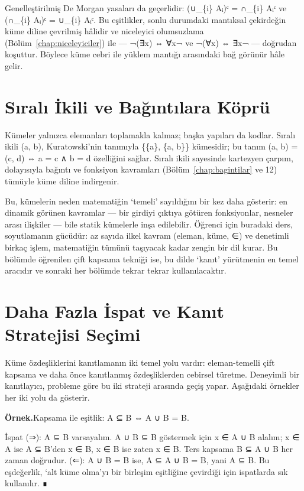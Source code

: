 Genelleştirilmiş De Morgan yasaları da geçerlidir: (∪\_\{i\} Aᵢ)ᶜ = ∩\_\{i\} Aᵢᶜ ve (∩\_\{i\} Aᵢ)ᶜ = ∪\_\{i\} Aᵢᶜ. Bu eşitlikler, sonlu durumdaki mantıksal çekirdeğin küme diline çevrilmiş hâlidir ve niceleyici olumsuzlama (Bölüm~\ref{chap:niceleyiciler}) ile — ¬(∃x) ⇔ ∀x¬ ve ¬(∀x) ⇔ ∃x¬ — doğrudan koşuttur. Böylece küme cebri ile yüklem mantığı arasındaki bağ görünür hâle gelir.

\section{Sıralı İkili ve Bağıntılara Köprü}

Kümeler yalnızca elemanları toplamakla kalmaz; başka yapıları da kodlar. Sıralı ikili (a, b), Kuratowski’nin tanımıyla \{\{a\}, \{a, b\}\} kümesidir; bu tanım (a, b) = (c, d) ⇔ a = c ∧ b = d özelliğini sağlar. Sıralı ikili sayesinde kartezyen çarpım, dolayısıyla bağıntı ve fonksiyon kavramları (Bölüm~\ref{chap:bagintilar} ve 12) tümüyle küme diline indirgenir.

Bu, kümelerin neden matematiğin ‘temeli’ sayıldığını bir kez daha gösterir: en dinamik görünen kavramlar — bir girdiyi çıktıya götüren fonksiyonlar, nesneler arası ilişkiler — bile statik kümelerle inşa edilebilir. Öğrenci için buradaki ders, soyutlamanın gücüdür: az sayıda ilkel kavram (eleman, küme, ∈) ve denetimli birkaç işlem, matematiğin tümünü taşıyacak kadar zengin bir dil kurar. Bu bölümde öğrenilen çift kapsama tekniği ise, bu dilde ‘kanıt’ yürütmenin en temel aracıdır ve sonraki her bölümde tekrar tekrar kullanılacaktır.

\section{Daha Fazla İspat ve Kanıt Stratejisi Seçimi}

Küme özdeşliklerini kanıtlamanın iki temel yolu vardır: eleman-temelli çift kapsama ve daha önce kanıtlanmış özdeşliklerden cebirsel türetme. Deneyimli bir kanıtlayıcı, probleme göre bu iki strateji arasında geçiş yapar. Aşağıdaki örnekler her iki yolu da gösterir.

\begin{tcolorbox}[bookbox,colback=cEx]\textbf{\textsf{\textcolor{cAcc}{Örnek.}}}\quad Kapsama ile eşitlik: A ⊆ B ⇔ A ∪ B = B.\par\medskip{}İspat (⇒): A ⊆ B varsayalım. A ∪ B ⊆ B göstermek için x ∈ A ∪ B alalım; x ∈ A ise A ⊆ B’den x ∈ B, x ∈ B ise zaten x ∈ B. Ters kapsama B ⊆ A ∪ B her zaman doğrudur. (⇐): A ∪ B = B ise, A ⊆ A ∪ B = B, yani A ⊆ B. Bu eşdeğerlik, ‘alt küme olma’yı bir birleşim eşitliğine çevirdiği için ispatlarda sık kullanılır. ∎\end{tcolorbox}

